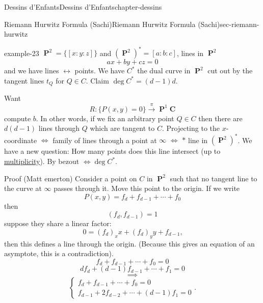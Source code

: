 \documentclass[oneside,10pt,]{book}
\numberwithin{equation}{section}
\newcommand{\lb}{[}
\newcommand{\rb}{]}
\newcommand{\CC}{\mathbf{C}}
\DeclareMathOperator{\PP}{\mathbf{P}}
\begin{document}
\begin{chapterptx}{Dessins d'Enfants}{}{Dessins d'Enfants}{}{}{chapter-dessins}
\begin{sectionptx}{Riemann Hurwitz Formula (Sachi)}{}{Riemann Hurwitz Formula (Sachi)}{}{}{sec-riemann-hurwitz}
\begin{example}{}{example-23}
\(\PP^2 = \{ \lb x:y:z \rb\}\) and \((\PP^2)^* = \lb a:b:c \rb\), lines in \(\PP^2\)%
\begin{equation*}
ax + by + cz = 0
\end{equation*}
and we have lines \(\leftrightarrow\) points. We have \(C^*\) the dual curve in \(\PP^2\) cut out by the tangent lines \(t_Q\) for \(Q \in C\). Claim \(\deg C^* = (d-1)d\).%
\par
\hypertarget{p-521}{}%
Want%
\begin{equation*}
R:\{P(x,y) = 0\} \xrightarrow\pi \PP^1\CC
\end{equation*}
compute \(b\). In other words, if we fix an arbitrary point \(Q\in C\) then there are \(d(d-1)\) lines through \(Q\) which are tangent to \(C\). Projecting to the \(x\)-coordinate \(\iff\) family of lines through a point at \(\infty\) \(\iff\) \(\ast\) line in \((\PP^2)^*\). We have a new question: How many points does this line intersect (up to \hyperref[def-riem-order-vanish]{multiplicity}). By bezout \(\iff  \deg C^*\).%
\par
\hypertarget{p-522}{}%
Proof (Matt emerton) Consider a point on \(C\) in \(\PP^2\) such that no tangent line to the curve at   \(\infty\) passes through it. Move this point to the origin. If we write%
\begin{equation*}
P(x,y) = f_d + f_{d-1} + \cdots + f_0
\end{equation*}
then%
\begin{equation*}
(f_d, f_{d-1}) = 1
\end{equation*}
suppose they share a linear factor:%
\begin{equation*}
0 = (f_d)_x x + (f_d)_y y + f_{d-1}\text{,}
\end{equation*}
then this defines a line through the origin. (Because this gives an equation of an asymptote, this is a contradiction).%
\begin{equation*}
f_d + f_{d-1} + \cdots + f_0 = 0
\end{equation*}
%
\begin{equation*}
d f_d + (d-1) f_{d-1} + \cdots + f_1 = 0
\end{equation*}
%
\begin{equation*}
\implies
\end{equation*}
%
\begin{equation*}
\begin{cases}  f_d + f_{d-1} + \cdots + f_0 = 0 \\ f_{d-1} + 2f_{d-2} + \cdots + (d-1) f_1 = 0\end{cases}\text{.}

\end{equation*}
\end{example}
\end{sectionptx}
\end{chapterptx}
\end{document}
